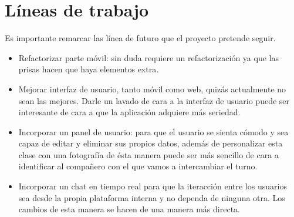    \section{Líneas de trabajo}\label{lineas_futuras}
   Es importante remarcar las línea de futuro que el proyecto pretende seguir.
  
\begin{itemize}
	\item Refactorizar parte móvil: sin duda requiere un refactorización ya que las prisas hacen que haya elementos extra. 
	\item Mejorar interfaz de usuario, tanto móvil como web, quizás actualmente no sean las mejores. Darle un lavado de cara a la interfaz de usuario puede ser interesante de cara a que la aplicación adquiere más seriedad.
	\item Incorporar un panel de usuario: para que el usuario se sienta cómodo y sea capaz de editar y eliminar sus propios datos, además de personalizar esta clase con una fotografía de ésta manera puede ser más sencillo de cara a identificar al compañero con el que vamos a intercambiar el turno.
	\item Incorporar un chat en tiempo real para que la iteracción entre los usuarios sea desde la propia plataforma interna y no dependa de ninguna otra. Los cambios de esta manera se hacen de una manera más directa.
\end{itemize}